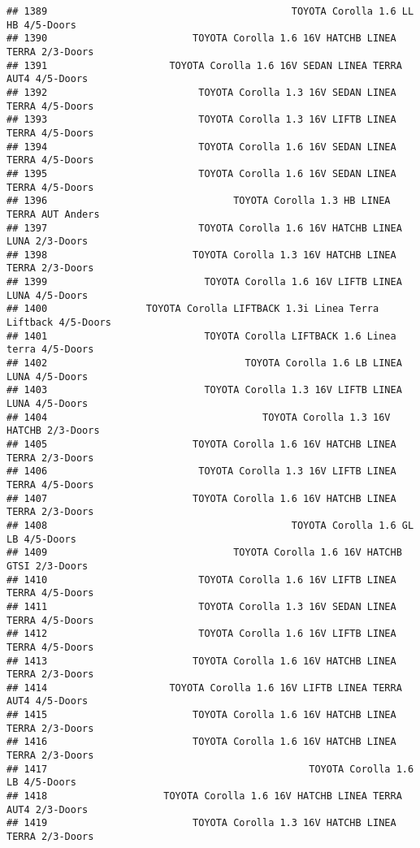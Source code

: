 \documentclass[]{article}
\begin{document}
\begin{verbatim}
## 1389                                          TOYOTA Corolla 1.6 LL HB 4/5-Doors
## 1390                         TOYOTA Corolla 1.6 16V HATCHB LINEA TERRA 2/3-Doors
## 1391                     TOYOTA Corolla 1.6 16V SEDAN LINEA TERRA AUT4 4/5-Doors
## 1392                          TOYOTA Corolla 1.3 16V SEDAN LINEA TERRA 4/5-Doors
## 1393                          TOYOTA Corolla 1.3 16V LIFTB LINEA TERRA 4/5-Doors
## 1394                          TOYOTA Corolla 1.6 16V SEDAN LINEA TERRA 4/5-Doors
## 1395                          TOYOTA Corolla 1.6 16V SEDAN LINEA TERRA 4/5-Doors
## 1396                                TOYOTA Corolla 1.3 HB LINEA TERRA AUT Anders
## 1397                          TOYOTA Corolla 1.6 16V HATCHB LINEA LUNA 2/3-Doors
## 1398                         TOYOTA Corolla 1.3 16V HATCHB LINEA TERRA 2/3-Doors
## 1399                           TOYOTA Corolla 1.6 16V LIFTB LINEA LUNA 4/5-Doors
## 1400                 TOYOTA Corolla LIFTBACK 1.3i Linea Terra Liftback 4/5-Doors
## 1401                           TOYOTA Corolla LIFTBACK 1.6 Linea terra 4/5-Doors
## 1402                                  TOYOTA Corolla 1.6 LB LINEA LUNA 4/5-Doors
## 1403                           TOYOTA Corolla 1.3 16V LIFTB LINEA LUNA 4/5-Doors
## 1404                                     TOYOTA Corolla 1.3 16V HATCHB 2/3-Doors
## 1405                         TOYOTA Corolla 1.6 16V HATCHB LINEA TERRA 2/3-Doors
## 1406                          TOYOTA Corolla 1.3 16V LIFTB LINEA TERRA 4/5-Doors
## 1407                         TOYOTA Corolla 1.6 16V HATCHB LINEA TERRA 2/3-Doors
## 1408                                          TOYOTA Corolla 1.6 GL LB 4/5-Doors
## 1409                                TOYOTA Corolla 1.6 16V HATCHB GTSI 2/3-Doors
## 1410                          TOYOTA Corolla 1.6 16V LIFTB LINEA TERRA 4/5-Doors
## 1411                          TOYOTA Corolla 1.3 16V SEDAN LINEA TERRA 4/5-Doors
## 1412                          TOYOTA Corolla 1.6 16V LIFTB LINEA TERRA 4/5-Doors
## 1413                         TOYOTA Corolla 1.6 16V HATCHB LINEA TERRA 2/3-Doors
## 1414                     TOYOTA Corolla 1.6 16V LIFTB LINEA TERRA AUT4 4/5-Doors
## 1415                         TOYOTA Corolla 1.6 16V HATCHB LINEA TERRA 2/3-Doors
## 1416                         TOYOTA Corolla 1.6 16V HATCHB LINEA TERRA 2/3-Doors
## 1417                                             TOYOTA Corolla 1.6 LB 4/5-Doors
## 1418                    TOYOTA Corolla 1.6 16V HATCHB LINEA TERRA AUT4 2/3-Doors
## 1419                         TOYOTA Corolla 1.3 16V HATCHB LINEA TERRA 2/3-Doors

\end{verbatim}
\end{document}
